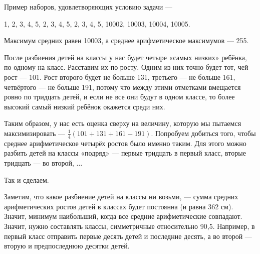 
\begin{itemize}
\itA Пример наборов, удовлетворяющих условию задачи —

1, 2, 3, 4, 5, 2, 3, 4, 5, 2, 3, 4, 5, 10002, 10003, 10004, 10005.

Максимум средних равен 10003, а среднее арифметическое максимумов — 255.

\itB После разбиения детей на классы у нас будет четыре «самых низких» ребёнка, по одному на класс. Расставим их по росту. Одним из них точно будет тот, чей рост — \SI{101}{}. Рост второго будет не больше 131, третьего — не больше 161, четвёртого — не больше 191, потому что между этими отметками вмещается ровно по тридцать детей, и если не все они будут в одном классе, то более высокий самый низкий ребёнок окажется среди них.

Таким образом, у нас есть оценка сверху на величину, которую мы пытаемся максимизировать — $\tfrac{1}{4}(101+131+161+191)$. Попробуем добиться того, чтобы среднее арифметическое четырёх ростов было именно таким. Для этого можно разбить детей на классы «подряд» — первые тридцать в первый класс, вторые тридцать — во второй, $\ldots$

Так и сделаем.

\itC Заметим, что какое разбиение детей на классы ни возьми, — сумма средних арифметических ростов детей в классах будет постоянна (и равна 362 см). Значит, минимум наибольший, когда все средние арифметические совпадают. Значит, нужно составлять классы, симметричные относительно 90,5. Например, в первый класс отправить первые десять детей и последние десять, а во второй — вторую и предпоследнюю десятки детей.
\end{itemize}